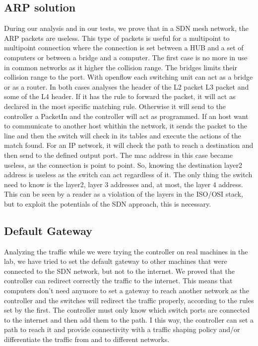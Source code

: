 \documentclass[conference,10pt]{IEEEtran}
\begin{document}
\subsection{ARP solution}
During our analysis and in our tests, we prove that in a SDN mesh network, the ARP packets are useless.
This type of packets is useful for a multipoint to multipoint connection where the connection is set between a
HUB and a set of computers or between a bridge and a computer. The first case is no more in use in common networks as
it higher the collision range. The bridges limits their collision range to the port. With openflow each switching unit can
act as a bridge or as a router. In both cases analyses the header of the L2 packet L3 packet and some of the L4 header.
If it has the rule to forward the packet, it will act as declared in the most specific matching rule. Otherwise it will
send to the controller a PacketIn and the controller will act as programmed. If an host want to communicate to another host whithin
the network, it sends the packet to the line and then the switch will check in its tables and execute the actions of the match found.
For an IP network, it will check the path to reach a destination and then send to the defined output port. The mac address in this case
became useless, as the connection is point to point. So, knowing the destination layer2 address is useless as the switch can act
regardless of it. The only thing the switch need to know is the layer2, layer 3 addresses and, at most, the layer 4 address.
This can be seen by a reader as a violation of the layers in the ISO/OSI stack, but to exploit the potentials of the SDN approach,
this is necessary.

\subsection{Default Gateway}
Analyzing the traffic while we were trying the controller on real machines in the lab, we have tried to set the default gateway to
other machines that were connected to the SDN network, but not to the internet. We proved that the controller can redirect correctly the
traffic to the internet. This means that
computers don't need anymore to set a gateway to reach another network as the controller and the switches will redirect the traffic
properly, according to the rules set by the first. The controller must only know which switch ports are connected to the
internet and then add them to the path. I this way, the controller can set a path to reach it and provide connectivity with
a traffic shaping policy and/or differentiate the traffic from and to different networks.
\end{document}
